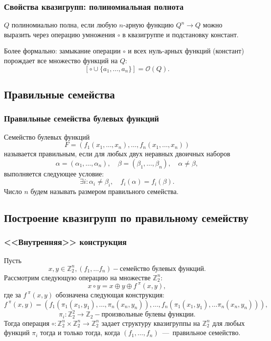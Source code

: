 \begin{frame}
    \frametitle{Свойства квазигрупп: полиномиальная полнота}
    \begin{dfn}
        $Q$ полиномиально полна, если любую $n$-арную функцию $Q^n \to Q$ можно выразить через операцию умножения $\circ$ в квазигруппе и подстановку констант.

        \pause
        Более формально: замыкание операции $\circ$ и всех нуль-арных функций (констант) порождает все множество функций на $Q:$
        \[
            [\circ \cup \{a_1, \ldots, a_n\}] = \mathcal{O}(Q).
        \]
    \end{dfn}
\end{frame}


\subsection{Правильные семейства}

\begin{frame}
    \frametitle{Правильные семейства булевых функций}
    \begin{dfn}
        Семейство булевых функций 
        \[ 
            F = (f_1(x_1, \ldots, x_n), \ldots, f_n(x_1, \ldots, x_n))
        \]
        называется правильным, если для любых двух неравных двоичных наборов 
        \[
            \alpha = (\alpha_1, \ldots, \alpha_n), \quad 
            \beta = (\beta_1, \ldots, \beta_n), \quad 
            \alpha \ne \beta,
        \]
        выполняется следующее условие:
        \pause
        \[ 
            \exists i: 
            \alpha_i \ne \beta_i, \quad f_i(\alpha) = f_i(\beta). 
        \]
        Число $n$ будем называть размером правильного семейства.
    \end{dfn}
\end{frame}

\subsection{Построение квазигрупп по правильному семейству}

\begin{frame}
    \frametitle{<<Внутренняя>> конструкция}
    \begin{thm}
        Пусть 
        \[
            x, y \in \mathbb{Z}_2^n, (f_1, \ldots f_n) - \text{семейство булевых функций.}
        \]
        Рассмотрим следующую операцию на множестве $\mathbb{Z}_2^n:$
        \[
            x \circ y = x \oplus y \oplus f^{\; \pi}(x, y),
        \]
        \pause
        где за $f^{\; \pi}(x, y)$ обозначена следующая конструкция:
        \[
            f^{\; \pi}(x, y) = 
            (f_1(\pi_1(x_1, y_1), \ldots, \pi_n(x_n, y_n)), 
            \ldots, f_n(\pi_1(x_1, y_1), \ldots \pi_n(x_n, y_n))),
        \]
        \[
            \pi_i : \mathbb{Z}_2^2 \to \mathbb{Z}_2 - \text{произвольные булевы функции.}
        \]
        \pause
        Тогда операция $\circ : \mathbb{Z}_2^n \times \mathbb{Z}_2^n \to \mathbb{Z}_2^n$ задает структуру квазигруппы на $\mathbb{Z}_2^n$ для любых функций $\pi_i$ тогда и только тогда, когда $(f_1, \ldots, f_n)$~---~правильное семейство.
    \end{thm}
\end{frame}



